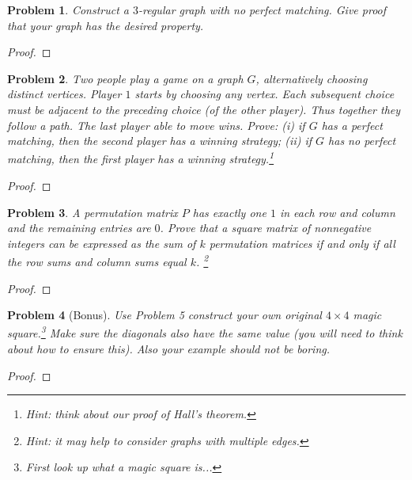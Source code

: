 \documentclass[11pt]{article}
\newtheorem{problem}{Problem}
\begin{document}
\begin{problem}
Construct a $3$-regular graph with no perfect matching. Give proof that your graph has the desired property. 
\end{problem}

\begin{proof}

\end{proof}

\begin{problem}
Two people play a game on a graph $G$, alternatively choosing distinct vertices. Player $1$ starts by choosing any vertex. Each subsequent choice must be adjacent to the preceding choice (of the other player). Thus together they follow a path. The last player able to move wins. Prove: (i) if $G$ has a perfect matching, then the second player has a winning strategy; (ii) if $G$ has no perfect matching, then the first player has a winning strategy.\footnote{Hint: think about our proof of Hall's theorem.} 
\end{problem}

\begin{proof}

\end{proof}

\begin{problem}
A permutation matrix $P$ has exactly one $1$ in each row and column and the remaining entries are $0$.  Prove that a square matrix of nonnegative integers can be expressed as the sum of $k$ permutation matrices if and only if all the row sums and column sums equal $k$. \footnote{Hint: it may help to consider graphs with multiple edges. }
\end{problem}

\begin{proof}

\end{proof}

\begin{problem}[Bonus] Use Problem 5 construct your own original $4\times 4$ magic square.\footnote{First look up what a magic square is...} Make sure the diagonals also have the same value (you will need to think about how to ensure this). Also your example should not be boring.
\end{problem}

\begin{proof}

\end{proof}
\end{document}
